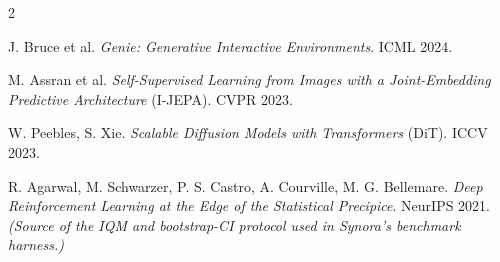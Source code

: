 \documentclass[10pt,a4paper]{article}
\begin{document}
{\begin{multicols}{2}
\begin{enumerate}[leftmargin=5.5mm,itemsep=0.8mm,label={\color{muted}[\arabic*]}]
  \item J. Bruce et al. \emph{Genie: Generative Interactive Environments}. ICML 2024.
  \item M. Assran et al. \emph{Self-Supervised Learning from Images with a Joint-Embedding Predictive Architecture} (I-JEPA). CVPR 2023.
  \item W. Peebles, S. Xie. \emph{Scalable Diffusion Models with Transformers} (DiT). ICCV 2023.
  \item R. Agarwal, M. Schwarzer, P. S. Castro, A. Courville, M. G. Bellemare. \emph{Deep Reinforcement Learning at the Edge of the Statistical Precipice}. NeurIPS 2021. \emph{(Source of the IQM and bootstrap-CI protocol used in Synora's benchmark harness.)}
\end{enumerate}
\end{multicols}}
\end{document}
